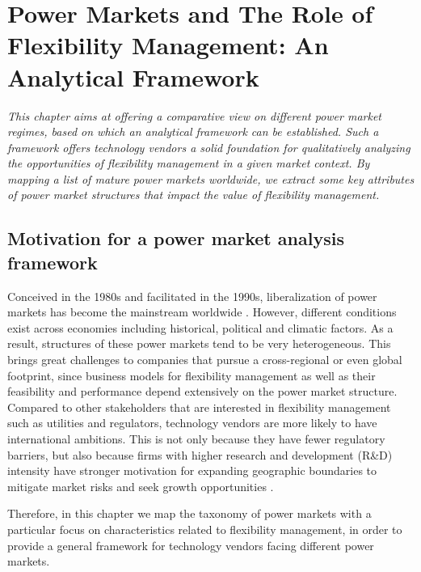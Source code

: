 \chapter{Power Markets and The Role of Flexibility Management: An Analytical Framework}
\label{ch:market}
\textit{This chapter aims at offering a comparative view on different power market regimes, based on which an analytical framework can be established. Such a framework offers technology vendors a solid foundation for qualitatively analyzing the opportunities of flexibility management in a given market context. By mapping a list of mature power markets worldwide, we extract some key attributes of power market structures that impact the value of flexibility management.}

\section{Motivation for a power market analysis framework}

Conceived in the 1980s and facilitated in the 1990s, liberalization of power markets has become the mainstream worldwide \cite{Srivastava2011,Ranci2013,Vagliasindi2013}. However, different conditions exist across economies including historical, political and climatic factors. As a result, structures of these power markets tend to be very heterogeneous. %
This brings great challenges to companies that pursue a cross-regional or even global footprint, since business models for flexibility management as well as their feasibility and performance depend extensively on the power market structure. Compared to other stakeholders that are interested in flexibility management such as utilities and regulators, technology vendors are more likely to have international ambitions. This is not only because they have fewer regulatory barriers, but also because firms with higher research and development (R\&D) intensity have stronger motivation for expanding geographic boundaries to mitigate market risks and seek growth opportunities \cite{Brouthers2007}.

Therefore, in this chapter we map the taxonomy of power markets with a particular focus on characteristics related to flexibility management, in order to provide a general framework for technology vendors facing different power markets.

